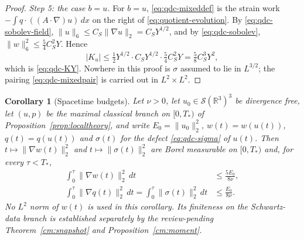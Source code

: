 \documentclass[11pt]{article}
\newtheorem{corollary}[theorem]{Corollary}
\theoremstyle{definition}
\theoremstyle{plain}
\newcommand{\R}{\mathbb R}
\newcommand{\norm}[1]{\lVert #1\rVert}
\begin{document}
\begin{proof}
\emph{Step 5: the case $b=u$.}  For $b=u$, \eqref{eq:qdc-mixeddef} is the
strain work $-\int q\cdot((A\cdot\nabla)u)\,dx$ on the right of
\eqref{eq:quotient-evolution}.  By \eqref{eq:qdc-sobolev-field},
$\norm u_6\le C_S\norm{\nabla u}_2=C_SY^{1/2}$, and by
\eqref{eq:qdc-sobolev}, $\norm w_6^2\le\frac54C_S^2Y$.  Hence
\[
 |K_u|\le\tfrac12Y^{1/2}\cdot C_SY^{1/2}\cdot\tfrac54C_S^2Y
 =\tfrac58C_S^3Y^2 ,
\]
which is \eqref{eq:qdc-KY}.  Nowhere in this proof is $\sigma$ assumed to
lie in $L^{3/2}$; the pairing \eqref{eq:qdc-mixedpair} is carried out in
$L^2\times L^2$.
\end{proof}

\begin{corollary}[Spacetime budgets]\label{cor:quotient-budgets}
Let $\nu>0$, let $u_0\in\mathcal S(\R^3)^3$ be divergence free, let $(u,p)$
be the maximal classical branch on $[0,T_*)$ of
Proposition~\ref{prop:localtheory}, and write $E_0=\norm{u_0}_2^2$,
$w(t)=w(u(t))$, $q(t)=q(u(t))$ and $\sigma(t)$ for the defect
\eqref{eq:qdc-sigma} of $u(t)$.  Then $t\mapsto\norm{\nabla w(t)}_2^2$ and
$t\mapsto\norm{\sigma(t)}_2^2$ are Borel measurable on $[0,T_*)$ and, for
every $\tau<T_*$,
\begin{align}
 \int_0^\tau\norm{\nabla w(t)}_2^2\,dt&\le\frac{5E_0}{8\nu},
 \label{eq:qdc-wbudget}\\
 \int_0^\tau\norm{\nabla q(t)}_2^2\,dt
 =\int_0^\tau\norm{\sigma(t)}_2^2\,dt&\le\frac{E_0}{8\nu}.
 \label{eq:qdc-sigmabudget}
\end{align}
No $L^2$ norm of $w(t)$ is used in this corollary. Its finiteness on the
Schwartz-data branch is established separately by the review-pending
Theorem~\ref{cm:snapshot} and Proposition~\ref{cm:moment}.
\end{corollary}
\end{document}
